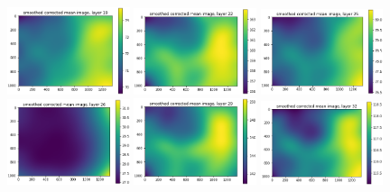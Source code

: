 \documentclass[letterpaper,11pt]{article}
\begin{document}
\begin{figure}[!ht]
\includegraphics[width=0.32\textwidth]{images/results/unmasked_smoothed_corrected_mean_image_layers_vectra/unmasked_smoothed_corrected_mean_image_layer_19}
\includegraphics[width=0.32\textwidth]{images/results/unmasked_smoothed_corrected_mean_image_layers_vectra/unmasked_smoothed_corrected_mean_image_layer_22}
\includegraphics[width=0.32\textwidth]{images/results/unmasked_smoothed_corrected_mean_image_layers_vectra/unmasked_smoothed_corrected_mean_image_layer_25}
\includegraphics[width=0.32\textwidth]{images/results/unmasked_smoothed_corrected_mean_image_layers_vectra/unmasked_smoothed_corrected_mean_image_layer_26}
\includegraphics[width=0.32\textwidth]{images/results/unmasked_smoothed_corrected_mean_image_layers_vectra/unmasked_smoothed_corrected_mean_image_layer_29}
\includegraphics[width=0.32\textwidth]{images/results/unmasked_smoothed_corrected_mean_image_layers_vectra/unmasked_smoothed_corrected_mean_image_layer_32}

\end{figure}
\end{document}
